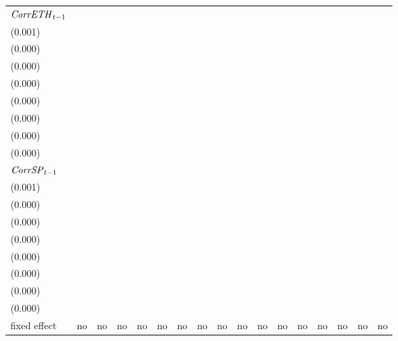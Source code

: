 \begin{tabular}{lllllllllllllllll}
${{\it CorrETH}}_{t-1}$      &    \makecell{$-0.001^{}$ \\(0.001)} &                                     &    \makecell{$0.000^{}$ \\(0.000)} &                                    &  \makecell{$-0.005^{**}$ \\(0.000)} &                                     &    \makecell{$-0.000^{}$ \\(0.000)} &                                     &  \makecell{$-0.005^{**}$ \\(0.000)} &                                     &  \makecell{$-0.000^{**}$ \\(0.000)} &                                     &  \makecell{$-0.002^{**}$ \\(0.000)} &                                     &    \makecell{$0.000^{}$ \\(0.000)} &                                    \\
${{\it CorrSP}}_{t-1}$       &                                     &  \makecell{$-0.002^{**}$ \\(0.001)} &                                    &    \makecell{$0.000^{}$ \\(0.000)} &                                     &  \makecell{$-0.007^{**}$ \\(0.000)} &                                     &    \makecell{$-0.000^{}$ \\(0.000)} &                                     &  \makecell{$-0.007^{**}$ \\(0.000)} &                                     &  \makecell{$-0.000^{**}$ \\(0.000)} &                                     &  \makecell{$-0.002^{**}$ \\(0.000)} &                                    &    \makecell{$0.000^{}$ \\(0.000)} \\
fixed effect                 &                                  no &                                  no &                                 no &                                 no &                                  no &                                  no &                                  no &                                  no &                                  no &                                  no &                                  no &                                  no &                                  no &                                  no &                                 no &                                 no \\

\end{tabular}
